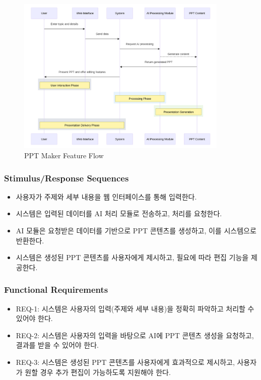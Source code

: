 \documentclass[a4paper, 12pt]{article}
\begin{document}
\begin{figure}[H]
\centering
\includegraphics[width=0.9\textwidth]{img/ppt_maker.png}
\caption{PPT Maker Feature Flow}
\end{figure}

\subsubsection{Stimulus/Response Sequences}
\begin{itemize}
  \item 사용자가 주제와 세부 내용을 웹 인터페이스를 통해 입력한다.
  \item 시스템은 입력된 데이터를 AI 처리 모듈로 전송하고, 처리를 요청한다.
  \item AI 모듈은 요청받은 데이터를 기반으로 PPT 콘텐츠를 생성하고, 이를 시스템으로 반환한다.
  \item 시스템은 생성된 PPT 콘텐츠를 사용자에게 제시하고, 필요에 따라 편집 기능을 제공한다.
\end{itemize}

\subsubsection{Functional Requirements}
\begin{itemize}
  \item REQ-1: 시스템은 사용자의 입력(주제와 세부 내용)을 정확히 파악하고 처리할 수 있어야 한다.
  \item REQ-2: 시스템은 사용자의 입력을 바탕으로 AI에 PPT 콘텐츠 생성을 요청하고, 결과를 받을 수 있어야 한다.
  \item REQ-3: 시스템은 생성된 PPT 콘텐츠를 사용자에게 효과적으로 제시하고, 사용자가 원할 경우 추가 편집이 가능하도록 지원해야 한다.
\end{itemize}
\end{document}

